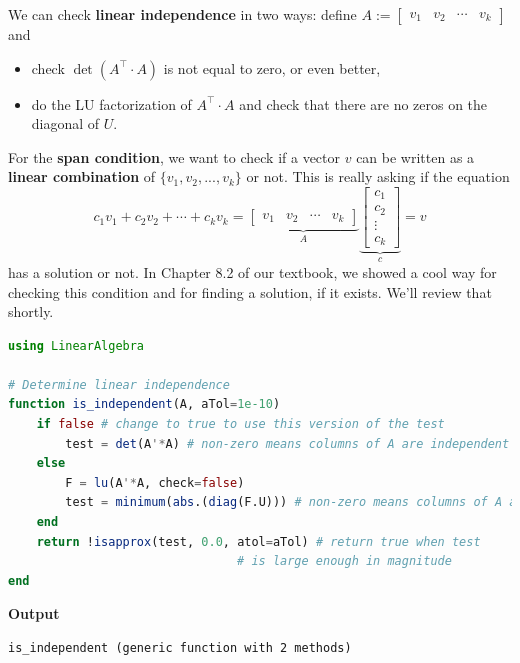\begin{rem} We can check \textbf{linear independence} in two ways: define $A:=\begin{bmatrix} v_1 & v_2 & \cdots & v_k\end{bmatrix}$ and 
\begin{itemize}
    \item check $\det(A^\top \cdot A)$ is not equal to zero, or even better, \item do the LU factorization of $A^\top \cdot A$ and check that there are no zeros on the diagonal of $U$. 
\end{itemize}

 For the \textbf{span condition}, we want to check if a vector $v$ can be written as a \textbf{linear combination} of  $\{v_1, v_2, ..., v_k\}$ or not. This is really asking if the equation
$$c_1 v_1 + c_2 v_2 + \cdots + c_k v_k = \underbrace{\begin{bmatrix} v_1 & v_2 & \cdots & v_k\end{bmatrix}}_{A} \underbrace{\begin{bmatrix} c_1\\ c_2 \\ \vdots \\c_k\end{bmatrix}}_{c} = v  $$
has a solution or not. In Chapter 8.2 of our textbook, we showed a cool way for checking this condition and for finding a solution, if it exists. We'll review that shortly. 
\end{rem}

\begin{lstlisting}[language=Julia,style=mystyle]
using LinearAlgebra

# Determine linear independence 
function is_independent(A, aTol=1e-10)
    if false # change to true to use this version of the test
        test = det(A'*A) # non-zero means columns of A are independent
    else 
        F = lu(A'*A, check=false)
        test = minimum(abs.(diag(F.U))) # non-zero means columns of A are independent
    end
    return !isapprox(test, 0.0, atol=aTol) # return true when test
                                # is large enough in magnitude
end
\end{lstlisting}
\textbf{Output} 
\begin{verbatim}
is_independent (generic function with 2 methods)
\end{verbatim}

